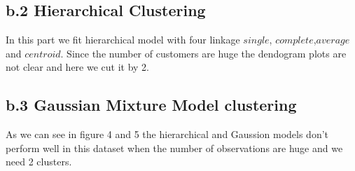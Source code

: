 \documentclass[a4paper, 11pt]{article}
\begin{document}
\subsection*{b.2 Hierarchical Clustering}
In this part we fit hierarchical model with four linkage $single$, $complete$,$average$ and $centroid$. Since the number of customers are huge the dendogram plots are not clear and here we cut it by 2.

\subsection*{b.3 Gaussian Mixture Model clustering}
As we can see  in figure 4 and 5 the hierarchical and Gaussion models don't perform well in this dataset when the number of observations are huge and we need 2 clusters.
\end{document}
